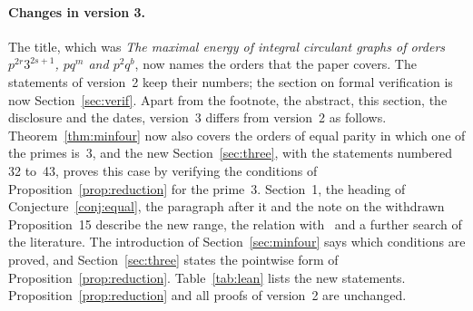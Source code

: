 \documentclass[11pt]{article}
\theoremstyle{remark}
\begin{document}
\paragraph{Changes in version 3.}
The title, which was \emph{The maximal energy of integral circulant graphs of orders
$p^{2r}3^{2s+1}$, $pq^m$ and $p^2q^b$}, now names the orders that the paper covers.
The statements of version~2 keep their numbers; the
section on formal verification is now Section~\ref{sec:verif}. Apart from the
footnote, the abstract, this section, the disclosure and the dates, version~3 differs
from version~2 as follows. Theorem~\ref{thm:minfour} now also covers the orders of
equal parity in which one of the primes is~$3$, and the new Section~\ref{sec:three},
with the statements numbered 32 to~43, proves this case by verifying
the conditions of Proposition~\ref{prop:reduction} for the prime~$3$. Section~1, the
heading of Conjecture~\ref{conj:equal}, the paragraph after it and the note on the
withdrawn Proposition~15 describe the new range, the relation with~\cite{jy2} and a
further search of the literature. The introduction of Section~\ref{sec:minfour} says
which conditions are proved, and Section~\ref{sec:three} states the pointwise form of
Proposition~\ref{prop:reduction}. Table~\ref{tab:lean} lists the new statements.
Proposition~\ref{prop:reduction} and all proofs of version~2 are unchanged.
\end{document}
